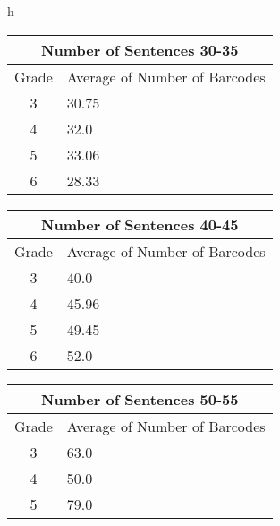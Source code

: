 \begin{figure}{h}
  \begin{minipage}[t]{0.33\textwidth}
  \centering
  \begin{tabular}{|c|p{2.5cm}|}
  \hline
  \multicolumn{2}{|c|}{Number of Sentences 30-35} \\
  \hline
  Grade & Average of Number of Barcodes \\
  \hline
  3 & 30.75 \\
  4 & 32.0 \\
  5 & 33.06 \\
  6 & 28.33 \\
  \hline
  \end{tabular}
  \end{minipage}%
  \begin{minipage}[t]{0.33\textwidth}
  \centering
  \begin{tabular}{|c|p{2.5cm}|}
  \hline
  \multicolumn{2}{|c|}{Number of Sentences 40-45} \\
  \hline
  Grade & Average of Number of Barcodes \\
  \hline
  3 & 40.0 \\
  4 & 45.96 \\
  5 & 49.45 \\
  6 & 52.0 \\
  \hline
  \end{tabular}
  \end{minipage}%
  \begin{minipage}[t]{0.33\textwidth}
  \centering
  \begin{tabular}{|c|p{2.5cm}|}
  \hline
  \multicolumn{2}{|c|}{Number of Sentences 50-55} \\
  \hline
  Grade & Average of Number of Barcodes \\
  \hline
  3 & 63.0 \\
  4 & 50.0 \\
  5 & 79.0 \\
  \hline
  \end{tabular}
  \end{minipage}

\end{figure}
